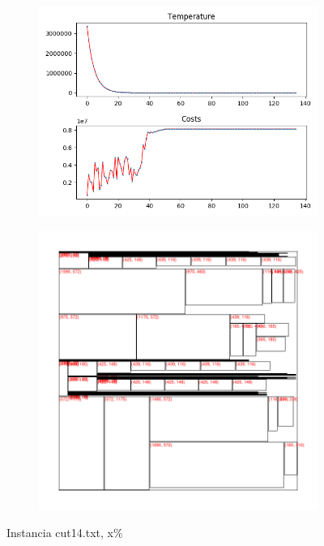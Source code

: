 \begin{figure}
\centering
\begin{subfigure}{.5\textwidth}
  \centering
  \includegraphics[width=1\linewidth]{results/cut14/1/plot}
  \label{fig:sub1}
\end{subfigure}%
\begin{subfigure}{.5\textwidth}
  \centering
  \includegraphics[width=1\linewidth]{results/cut14/1/cut}
  \label{fig:sub2}
\end{subfigure}
\caption{Instancia cut14.txt, x\%}
\label{fig:test}
\end{figure}


